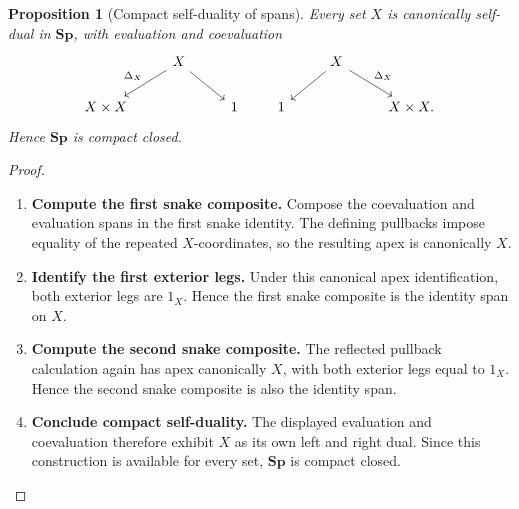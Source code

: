 \documentclass[oneside]{article}
\newcommand{\Sp}{\mathbf{Sp}}
\theoremstyle{plain}
\newtheorem{proposition}[theorem]{Proposition}
\theoremstyle{definition}
\theoremstyle{remark}
\begin{document}
\begin{proposition}[Compact self-duality of spans]
\label{prop:cgqg-span-compact-closed}
    Every set \(X\) is canonically self-dual in \(\Sp\), with evaluation and coevaluation
    \begin{equation*}
        \begin{tikzcd}
            & X
                \arrow[dl,"\Delta_X"']
                \arrow[dr]
            & \\
            X\times X
            &&
            1
        \end{tikzcd}
        \qquad
        \begin{tikzcd}
            & X
                \arrow[dl]
                \arrow[dr,"\Delta_X"]
            & \\
            1
            &&
            X\times X.
        \end{tikzcd}
    \end{equation*}
    Hence \(\Sp\) is compact closed.
\end{proposition}
\begin{proof}
    \leavevmode
    \begin{enumerate}[beginpenalty=10000]
        \item \textbf{Compute the first snake composite.} Compose the coevaluation and evaluation spans in the first snake identity. The defining pullbacks impose equality of the repeated \(X\)-coordinates, so the resulting apex is canonically \(X\).

        \item \textbf{Identify the first exterior legs.} Under this canonical apex identification, both exterior legs are \(1_X\). Hence the first snake composite is the identity span on \(X\).

        \item \textbf{Compute the second snake composite.} The reflected pullback calculation again has apex canonically \(X\), with both exterior legs equal to \(1_X\). Hence the second snake composite is also the identity span.

        \item \textbf{Conclude compact self-duality.} The displayed evaluation and coevaluation therefore exhibit \(X\) as its own left and right dual. Since this construction is available for every set, \(\Sp\) is compact closed. \qedhere
    \end{enumerate}
\end{proof}
\end{document}
